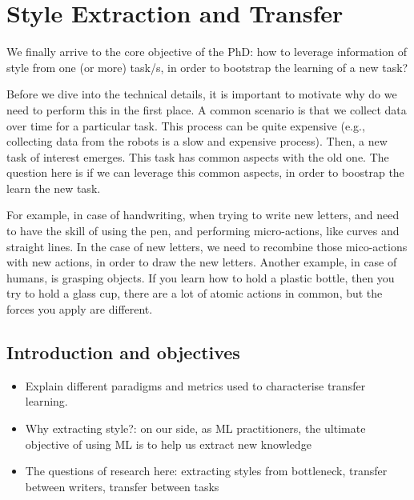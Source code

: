 \chapter{Style Extraction and Transfer}
\minitoc%

\par We finally arrive to the core objective of the PhD: how to leverage information of style from one (or more) \Gls{task}/s, in order to bootstrap the learning of a new task?

\par Before we dive into the technical details, it is important to motivate why do we need to perform this in the first place. A common scenario is that we collect data over time for a particular task. This process can be quite expensive (e.g., collecting data from the robots is a slow and expensive process). Then, a new task of interest emerges. This task has common aspects with the old one. The question here is if we can leverage this common aspects, in order to boostrap the learn the new task.

For example, in case of handwriting, when trying to write new letters, and need to have the skill of using the pen, and performing micro-actions, like curves and straight lines. In the case of new letters, we need to recombine those mico-actions with new actions, in order to draw the new letters. Another example, in case of humans, is grasping objects. If you learn how to hold a plastic bottle, then you try to hold a glass cup, there are a lot of atomic actions in common, but the forces you apply are different.

\section{Introduction and objectives}
  \begin{itemize}[noitemsep]
      \item Explain different paradigms and metrics used to characterise transfer learning.
      \item Why extracting style?: on our side, as ML practitioners, the ultimate objective of using ML is to help us extract new knowledge
      \item The questions of research here: extracting styles from bottleneck, transfer between writers, transfer between tasks
  \end{itemize}

